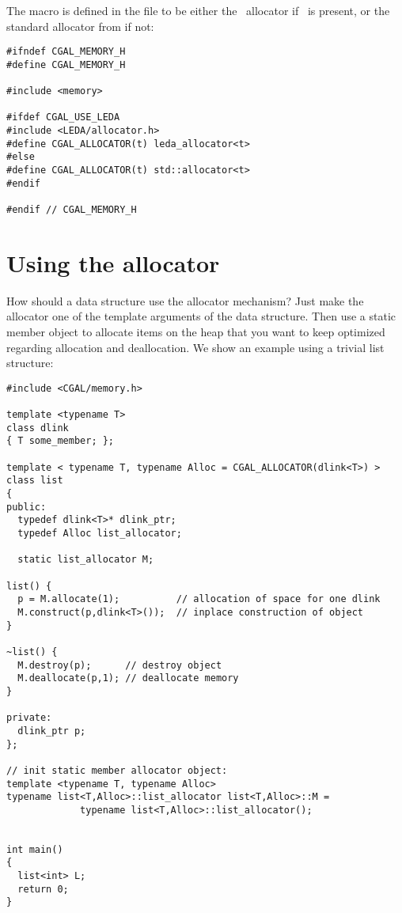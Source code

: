 The macro 
is defined in the file  to be either the \leda\ 
allocator if \leda\ is present, or the standard allocator from
 if not:

\begin{verbatim}
#ifndef CGAL_MEMORY_H
#define CGAL_MEMORY_H

#include <memory>

#ifdef CGAL_USE_LEDA
#include <LEDA/allocator.h>
#define CGAL_ALLOCATOR(t) leda_allocator<t>
#else
#define CGAL_ALLOCATOR(t) std::allocator<t>
#endif

#endif // CGAL_MEMORY_H
\end{verbatim}

\section{Using the allocator}
\label{sec:using_memory_allocator}

How should a data structure use the allocator mechanism? Just make the
allocator one of the template arguments of the data structure. Then
use a static member object to allocate items on the heap that you
want to keep optimized regarding allocation and deallocation. We
show an example using a trivial list structure:

\begin{verbatim}
#include <CGAL/memory.h>

template <typename T> 
class dlink 
{ T some_member; };

template < typename T, typename Alloc = CGAL_ALLOCATOR(dlink<T>) >
class list 
{
public:
  typedef dlink<T>* dlink_ptr;
  typedef Alloc list_allocator;

  static list_allocator M;

list() {
  p = M.allocate(1);          // allocation of space for one dlink
  M.construct(p,dlink<T>());  // inplace construction of object
}

~list() {
  M.destroy(p);      // destroy object
  M.deallocate(p,1); // deallocate memory
}

private:
  dlink_ptr p;
};

// init static member allocator object:
template <typename T, typename Alloc>
typename list<T,Alloc>::list_allocator list<T,Alloc>::M =
             typename list<T,Alloc>::list_allocator();


int main()
{
  list<int> L;
  return 0;
}
\end{verbatim}

